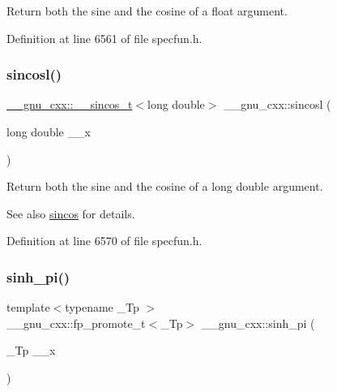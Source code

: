 Return both the sine and the cosine of a {\ttfamily float} argument. 

Definition at line 6561 of file specfun.\+h.

\mbox{\label{group__gnu__math__spec__func_ga96a7222e47d430a228973658ca9f6f35}} 
\subsubsection{\texorpdfstring{sincosl()}{sincosl()}}
{\footnotesize\ttfamily \hyperlink{struct____gnu__cxx_1_1____sincos__t}{\+\_\+\+\_\+gnu\+\_\+cxx\+::\+\_\+\+\_\+sincos\+\_\+t}$<$long double$>$ \+\_\+\+\_\+gnu\+\_\+cxx\+::sincosl (\begin{DoxyParamCaption}\item[{long double}]{\+\_\+\+\_\+x }\end{DoxyParamCaption})\hspace{0.3cm}{\ttfamily [inline]}}

Return both the sine and the cosine of a {\ttfamily  long double } argument.

\begin{DoxySeeAlso}{See also}
\hyperlink{group__gnu__math__spec__func_ga8041c24b528475bcf8a4178e484652a3}{sincos} for details. 
\end{DoxySeeAlso}


Definition at line 6570 of file specfun.\+h.

\mbox{\label{group__gnu__math__spec__func_gade43453b87b6b38c05b3fcce40870542}} 
\subsubsection{\texorpdfstring{sinh\+\_\+pi()}{sinh\_pi()}}
{\footnotesize\ttfamily template$<$typename \+\_\+\+Tp $>$ \\
\+\_\+\+\_\+gnu\+\_\+cxx\+::fp\+\_\+promote\+\_\+t$<$\+\_\+\+Tp$>$ \+\_\+\+\_\+gnu\+\_\+cxx\+::sinh\+\_\+pi (\begin{DoxyParamCaption}\item[{\+\_\+\+Tp}]{\+\_\+\+\_\+x }\end{DoxyParamCaption})\hspace{0.3cm}{\ttfamily [inline]}}

